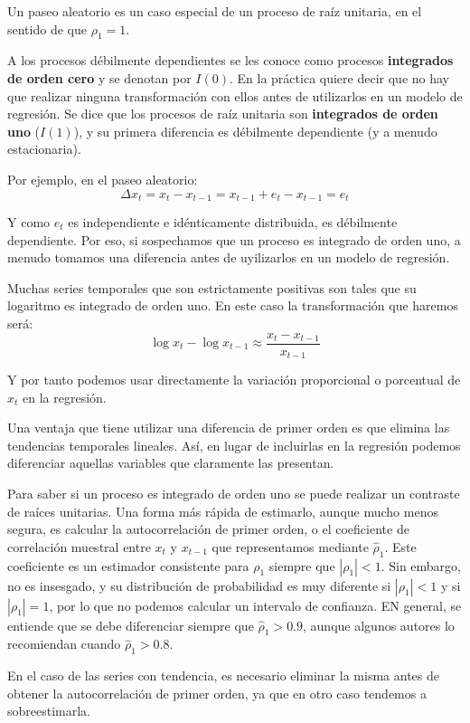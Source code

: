 Un paseo aleatorio es un caso especial de un proceso de ra\'iz unitaria, en el sentido de que $\rho_1=1$.

A los procesos d\'ebilmente dependientes se les conoce como procesos \textbf{integrados de orden cero} y se denotan por $I(0)$. En la pr\'actica quiere decir que no hay que realizar ninguna transformaci\'on con ellos antes de utilizarlos en un modelo de regresi\'on. Se dice que los procesos de ra\'iz unitaria son \textbf{integrados de orden uno} ($I(1)$), y su primera diferencia es d\'ebilmente dependiente (y a menudo estacionaria).

Por ejemplo, en el paseo aleatorio:
\[\Delta x_t=x_t-x_{t-1}=x_{t-1}+e_t-x_{t-1}=e_t\]

Y como $e_t$ es independiente e id\'enticamente distribuida, es d\'ebilmente dependiente. Por eso, si sospechamos que un proceso es integrado de orden uno, a menudo tomamos una diferencia antes de uyilizarlos en un modelo de regresi\'on.

Muchas series temporales que son estrictamente positivas son tales que su logaritmo es integrado de orden uno. En este caso la transformaci\'on que haremos ser\'a:
\[\log{x_t}-\log{x_{t-1}}\approx\dfrac{x_t-x_{t-1}}{x_{t-1}}\]

Y por tanto podemos usar directamente la variaci\'on proporcional o porcentual de $x_t$ en la regresi\'on.

Una ventaja que tiene utilizar una diferencia de primer orden es que elimina las tendencias temporales lineales. As\'i, en lugar de incluirlas en la regresi\'on podemos diferenciar aquellas variables que claramente las presentan.

Para saber si un proceso es integrado de orden uno se puede realizar un contraste de ra\'ices unitarias. Una forma m\'as r\'apida de estimarlo, aunque mucho menos segura, es calcular la autocorrelaci\'on de primer orden, o el coeficiente de correlaci\'on muestral entre $x_t$ y $x_{t-1}$ que representamos mediante $\hat{\rho}_1$. Este coeficiente es un estimador consistente para $\rho_1$ siempre que $|\rho_1|<1$. Sin embargo, no es insesgado, y su distribuci\'on de probabilidad es muy diferente si $|\rho_1|<1$ y si $|\rho_1|=1$, por lo que no podemos calcular un intervalo de confianza. EN general, se entiende que se debe diferenciar siempre que $\hat{\rho}_1>0.9$, aunque algunos autores lo recomiendan cuando $\hat{\rho}_1>0.8$.

En el caso de las series con tendencia, es necesario eliminar la misma antes de obtener la autocorrelaci\'on de primer orden, ya que en otro caso tendemos a sobreestimarla.

